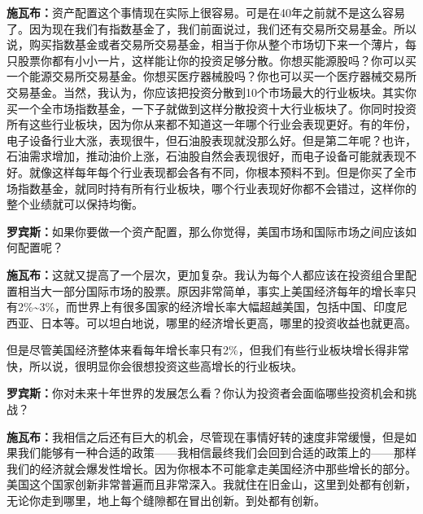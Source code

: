 \begin{BookQuote}
\textbf{施瓦布：}资产配置这个事情现在实际上很容易。可是在40年之前就不是这么容易了。因为现在我们有指数基金了，我们前面说过，我们还有交易所交易基金。所以说，购买指数基金或者交易所交易基金，相当于你从整个市场切下来一个薄片，每只股票你都有小小一片，这样能让你的投资足够分散。你想买能源股吗？你可以买一个能源交易所交易基金。你想买医疗器械股吗？你也可以买一个医疗器械交易所交易基金。当然，我认为，你应该把投资分散到10个市场最大的行业板块。其实你买一个全市场指数基金，一下子就做到这样分散投资十大行业板块了。你同时投资所有这些行业板块，因为你从来都不知道这一年哪个行业会表现更好。有的年份，电子设备行业大涨，表现很牛，但石油股表现就没那么好。但是第二年呢？也许，石油需求增加，推动油价上涨，石油股自然会表现很好，而电子设备可能就表现不好。就像这样每年每个行业表现都会各有不同，你根本预料不到。但是你买了全市场指数基金，就同时持有所有行业板块，哪个行业表现好你都不会错过，这样你的整个业绩就可以保持均衡。
\end{BookQuote}

\begin{BookQuote}
\textbf{罗宾斯：}如果你要做一个资产配置，那么你觉得，美国市场和国际市场之间应该如何配置呢？
\end{BookQuote}

\begin{BookQuote}
\textbf{施瓦布：}这就又提高了一个层次，更加复杂。我认为每个人都应该在投资组合里配置相当大一部分国际市场的股票。原因非常简单，事实上美国经济每年的增长率只有2\%\textasciitilde{}3\%，而世界上有很多国家的经济增长率大幅超越美国，包括中国、印度尼西亚、日本等。可以坦白地说，哪里的经济增长更高，哪里的投资收益也就更高。
\end{BookQuote}

但是尽管美国经济整体来看每年增长率只有2\%，但我们有些行业板块增长得非常快，所以说，很明显你会很想投资这些高增长的行业板块。

\begin{BookQuote}
\textbf{罗宾斯：}你对未来十年世界的发展怎么看？你认为投资者会面临哪些投资机会和挑战？
\end{BookQuote}

\begin{BookQuote}
\textbf{施瓦布：}我相信之后还有巨大的机会，尽管现在事情好转的速度非常缓慢，但是如果我们能够有一种合适的政策——我相信最终我们会回到合适的政策上的——那样我们的经济就会爆发性增长。因为你根本不可能拿走美国经济中那些增长的部分。美国这个国家创新非常普遍而且非常深入。我就住在旧金山，这里到处都有创新，无论你走到哪里，地上每个缝隙都在冒出创新。到处都有创新。
\end{BookQuote}

